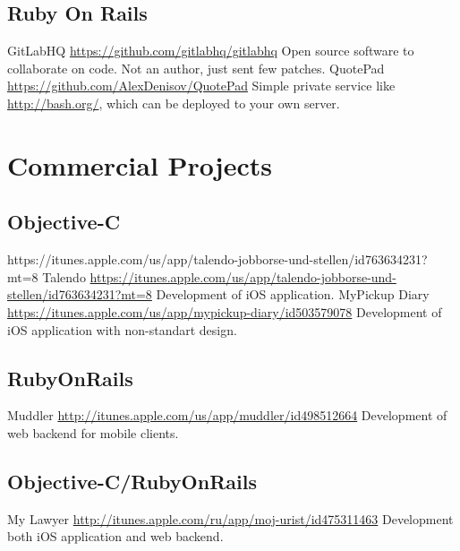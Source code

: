 \documentclass[11pt,a4paper]{moderncv}
\begin{document}
\subsection{Ruby On Rails}
\cvline
  {GitLabHQ}
  {\url{https://github.com/gitlabhq/gitlabhq}\newline{}
  Open source software to collaborate on code.\newline{}
  Not an author, just sent few patches.}
\cvline
  {QuotePad}
  {\url{https://github.com/AlexDenisov/QuotePad}\newline{}
  Simple private service like \url{http://bash.org/}, which can be deployed to your own server.}


\section{Commercial Projects}
  \subsection{Objective-C}
  https://itunes.apple.com/us/app/talendo-jobborse-und-stellen/id763634231?mt=8
  \cvline
    {Talendo}
    {\url{https://itunes.apple.com/us/app/talendo-jobborse-und-stellen/id763634231?mt=8}\newline{}
    Development of iOS application.}
  \cvline
    {MyPickup Diary}
    {\url{https://itunes.apple.com/us/app/mypickup-diary/id503579078}\newline{}
    Development of iOS application with non-standart design.}
  \subsection{RubyOnRails}
  \cvline
    {Muddler}
    {\url{http://itunes.apple.com/us/app/muddler/id498512664}\newline{}
    Development of web backend for mobile clients.}
  \subsection{Objective-C/RubyOnRails}
  \cvline
    {My Lawyer}
    {\url{http://itunes.apple.com/ru/app/moj-urist/id475311463}\newline{}
    Development both iOS application and web backend.}
\end{document}

